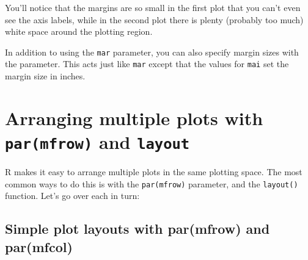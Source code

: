 \documentclass{tufte-book}\usepackage[]{graphicx}\usepackage[]{color}
\begin{document}

You'll notice that the margins are so small in the first plot that you can't even see the axis labels, while in the second plot there is plenty (probably too much) white space around the plotting region.

In addition to using the \texttt{mar} parameter, you can also specify margin sizes with the  parameter. This acts just like \texttt{mar} except that the values for \texttt{mai} set the margin size in inches.


\pagebreak

\section{Arranging multiple plots with \texttt{par(mfrow)} and \texttt{layout}}

R makes it easy to arrange multiple plots in the same plotting space. The most common ways to do this is with the \texttt{par(mfrow)} parameter, and the \texttt{layout()} function. Let's go over each in turn:

\subsection{Simple plot layouts with par(mfrow) and par(mfcol)}
\end{document}
